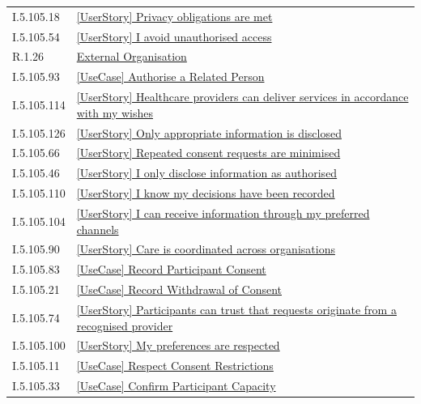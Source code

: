 \begin{longtable}{p{.22\linewidth}p{.73\linewidth}}
I.5.105.18 & \hyperref[element:b3518bc7c29040399b4f49964998c490]{[UserStory] Privacy obligations are met} \\
I.5.105.54 & \hyperref[element:b3bdb40657c24a378be8a6ccf9b9a1a3]{[UserStory] I avoid unauthorised access} \\
R.1.26 & \hyperref[element:b6c472ccf2f349b2935cf591b2ad796b]{External Organisation} \\
I.5.105.93 & \hyperref[element:b72bdaa9caec4c24b4746fa3f1c4752d]{[UseCase] Authorise a Related Person} \\
I.5.105.114 & \hyperref[element:b98f893276074ce7ab99b36fa41362d1]{[UserStory] Healthcare providers can deliver services in accordance with my wishes} \\
I.5.105.126 & \hyperref[element:b9d6fc782b704a6f848f7b78607d76e3]{[UserStory] Only appropriate information is disclosed} \\
I.5.105.66 & \hyperref[element:beaf717cebb14594af35d99804053517]{[UserStory] Repeated consent requests are minimised} \\
I.5.105.46 & \hyperref[element:bf0a6df94e224e3cb4398f0fdecbad76]{[UserStory] I only disclose information as authorised} \\
I.5.105.110 & \hyperref[element:c157c82a58be425d821ed0a9fe18ce05]{[UserStory] I know my decisions have been recorded} \\
I.5.105.104 & \hyperref[element:c24da65b37754621af274266a50399e2]{[UserStory] I can receive information through my preferred channels} \\
I.5.105.90 & \hyperref[element:c2960612521d48a5884146a16153c64d]{[UserStory] Care is coordinated across organisations} \\
I.5.105.83 & \hyperref[element:c8456cb6532a46b18a73d2f168670215]{[UseCase] Record Participant Consent} \\
I.5.105.21 & \hyperref[element:ccbc47a1226648fda5232cc3efb98b9a]{[UseCase] Record Withdrawal of Consent} \\
I.5.105.74 & \hyperref[element:d0004f85e3df4f548eb31d6dc1df865d]{[UserStory] Participants can trust that requests originate from a recognised provider} \\
I.5.105.100 & \hyperref[element:d07669ca136a4b7ba938dfa52b4fbf37]{[UserStory] My preferences are respected} \\
I.5.105.11 & \hyperref[element:d0e1e9c1d0824850bf8b05c61dcb35cf]{[UseCase] Respect Consent Restrictions} \\
I.5.105.33 & \hyperref[element:d167ab090deb49ba882e551f2d080110]{[UseCase] Confirm Participant Capacity} \\

\end{longtable}
